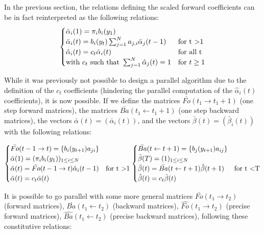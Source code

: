 In the previous section, the relations defining the scaled forward coefficients can be in fact reinterpreted as the following relations:
\begin{equation}
\begin{cases}
\bar{\alpha}_i(1) = \pi_i b_i(y_1) & \\
\bar{\alpha}_i(t) = b_i(y_t)\sum_{j=1}^{N}{a_{j,i}\bar{\alpha}_j(t-1)} & \text{for t \textgreater 1} \\
\hat{\alpha}_i(t) = c_t \bar{\alpha}_i(t) & \text{for all t} \\
\text{with } c_t \text{ such that } \sum_{j=1}^{N}{\hat{\alpha}_j(t)} = 1 & \text{for }t \ge 1
\end{cases}
\end{equation}

While it was previously not possible to design a parallel algorithm due to the definition of the $c_t$ coefficients (hindering the parallel computation of the $\hat{\alpha}_i(t)$ coefficients), it is now possible.
If we define the matrices $\bar{Fo}(t_1 \rightarrow t_1 + 1)$ (one step forward matrices), the matrices $\bar{Ba}( t_1 \leftarrow t_1 + 1)$ (one step backward matrices), the vectors $\bar{\alpha}(t)=(\bar{\alpha}_i(t))$, and the vectors $\bar{\beta}(t)=(\bar{\beta}_i(t))$ with the following relations:

\begin{equation}
\begin{cases}
\bar{Fo}( t - 1 \rightarrow t) =  \{b_i(y_{t+1})a_{ji}\} & \\
\bar{\alpha}(1) =  (\pi_i b_i(y_1))_{1 \le i \le N} & \\
\bar{\alpha}(t) =  \bar{Fo}( t - 1 \rightarrow t) \hat{\alpha}_i(t - 1) & \text{for t \textgreater 1} \\
\hat{\alpha}(t) = c_t \bar{\alpha}(t) &
\end{cases}
\begin{cases}
\bar{Ba}( t \leftarrow t + 1) = \{b_j(y_{t+1})a_{ij}\} & \\
\bar{\beta}(T) = (1)_{1 \le i \le N} & \\
\bar{\beta}(t) =  \bar{Ba}( t \leftarrow t + 1) \hat{\beta}(t + 1) & \text{for t \textless T} \\
\hat{\beta}(t) = c_t \bar{\beta}(t) &
\end{cases}
\end{equation}

It is possible to go parallel with some more general matrices $\bar{Fo}(t_1 \rightarrow t_2)$ (forward matrices), $\bar{Ba}(t_1 \leftarrow t_2)$ (backward matrices), $\hat{Fo}(t_1 \rightarrow t_2)$ (precise forward matrices), $\hat{Ba}(t_1 \leftarrow t_2)$ (precise backward matrices), following these constitutive relations:

